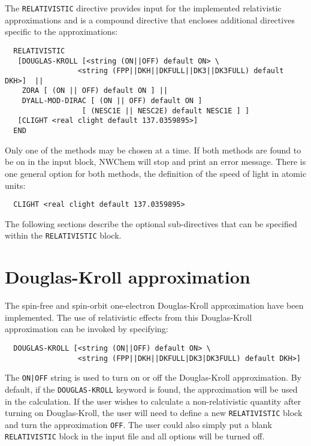 The \verb+RELATIVISTIC+ directive provides input for the implemented relativistic 
approximations and is a compound directive that encloses additional directives 
specific to the approximations:
\begin{verbatim}
  RELATIVISTIC
   [DOUGLAS-KROLL [<string (ON||OFF) default ON> \
                 <string (FPP||DKH||DKFULL||DK3||DK3FULL) default DKH>]  ||
    ZORA [ (ON || OFF) default ON ] || 
    DYALL-MOD-DIRAC [ (ON || OFF) default ON ] 
                  [ (NESC1E || NESC2E) default NESC1E ] ]
   [CLIGHT <real clight default 137.0359895>]
  END
\end{verbatim}

Only one of the methods may be chosen at a time.  If both methods are found
to be on in the input block, NWChem will stop and print an error message.
There is one general option for both methods, the definition of the speed 
of light in atomic units:

\begin{verbatim}
  CLIGHT <real clight default 137.0359895>
\end{verbatim}

The following sections describe the optional sub-directives that
can be specified within the \verb+RELATIVISTIC+ block.

\section{Douglas-Kroll approximation}
\label{sec:douglas-kroll}

The spin-free and spin-orbit one-electron Douglas-Kroll 
approximation have been implemented. The use of relativistic effects 
from this Douglas-Kroll approximation can be invoked by specifying:

\begin{verbatim}
  DOUGLAS-KROLL [<string (ON||OFF) default ON> \
                 <string (FPP||DKH||DKFULL|DK3|DK3FULL) default DKH>]
\end{verbatim}

The \verb+ON|OFF+ string is used to turn on or off the
Douglas-Kroll approximation.  By default, if the \verb+DOUGLAS-KROLL+
keyword is found, the approximation will be used in the calculation.
If the user wishes to calculate a non-relativistic quantity after turning
on Douglas-Kroll, the user will need to define a new \verb+RELATIVISTIC+
block and turn the approximation \verb+OFF+.  The user could also simply
put a blank \verb+RELATIVISTIC+ block in the input file and all options 
will be turned off.


